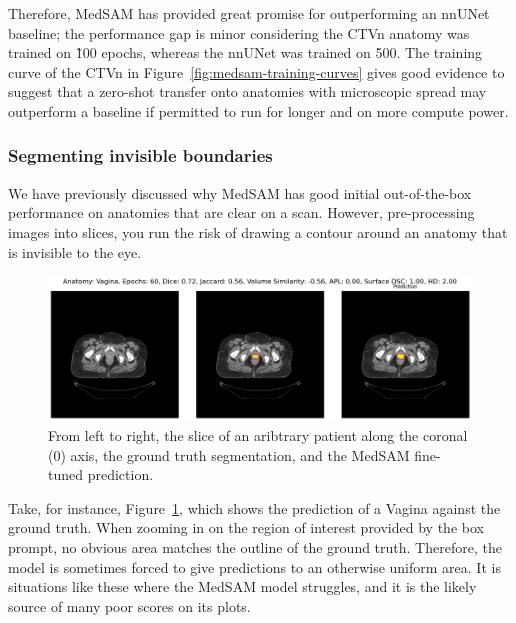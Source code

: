 \documentclass[12pt,twoside]{report}
\begin{document}
Therefore, MedSAM has provided great promise for outperforming an nnUNet baseline; the performance gap is minor considering the CTVn anatomy was trained on \~100 epochs, whereas the nnUNet was trained on 500. The training curve of the CTVn in Figure~\ref{fig:medsam-training-curves} gives good evidence to suggest that a zero-shot transfer onto anatomies with microscopic spread may outperform a baseline if permitted to run for longer and on more compute power. 


\subsubsection{Segmenting invisible boundaries}

We have previously discussed why MedSAM has good initial out-of-the-box performance on anatomies that are clear on a scan. However, pre-processing images into slices, you run the risk of drawing a contour around an anatomy that is invisible to the eye.

\begin{figure}[H]
  \centering
  \includegraphics[width=.85\linewidth]{../../research/source/code/SAM_Med/4_train_box_prompt/invisible-vagina.png}

  \caption{From left to right, the slice of an aribtrary patient along the coronal (0) axis, the ground truth segmentation, and the MedSAM fine-tuned prediction.}\label{fig:invisible-vagina}
\end{figure}

Take, for instance, Figure~\ref{fig:invisible-vagina}, which shows the prediction of a Vagina against the ground truth. When zooming in on the region of interest provided by the box prompt, no obvious area matches the outline of the ground truth. Therefore, the model is sometimes forced to give predictions to an otherwise uniform area. It is situations like these where the MedSAM model struggles, and it is the likely source of many poor scores on its plots.
\end{document}
